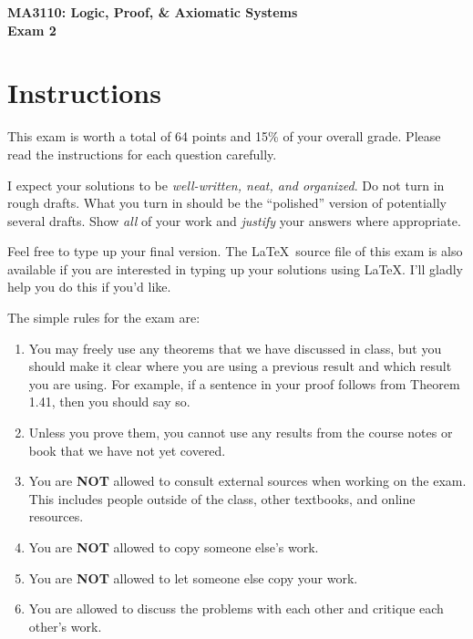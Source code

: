 \documentclass[11pt]{article}
\theoremstyle{definition}
\begin{document}
\begin{center}

{\Large\bf MA3110: Logic, Proof, \& Axiomatic Systems}\\
\smallskip
{\Large\bf Exam 2}

\bigskip

  
  \bigskip
  

\end{center}

\section*{Instructions}

This exam is worth a total of 64 points and 15\% of your overall grade.  Please read the instructions for each question carefully.

\bigskip

I expect your solutions to be \emph{well-written, neat, and organized}.  Do not turn in rough drafts.  What you turn in should be the ``polished'' version of potentially several drafts.  Show \emph{all} of your work and \emph{justify} your answers where appropriate. 
 
\bigskip

Feel free to type up your final version.  The \LaTeX\ source file of this exam is also available if you are interested in typing up your solutions using \LaTeX.  I'll gladly help you do this if you'd like.

\bigskip

The simple rules for the exam are:

\begin{enumerate}
\item You may freely use any theorems that we have discussed in class, but you should make it clear where you are using a previous result and which result you are using.  For example, if a sentence in your proof follows from Theorem 1.41, then you should say so.
\item Unless you prove them, you cannot use any results from the course notes or book that we have not yet covered.
\item You are \textbf{NOT} allowed to consult external sources when working on the exam.  This includes people outside of the class, other textbooks, and online resources.
\item You are \textbf{NOT} allowed to copy someone else's work.
\item You are \textbf{NOT} allowed to let someone else copy your work.
\item You are allowed to discuss the problems with each other and critique each other's work.
\end{enumerate}
\end{document}
